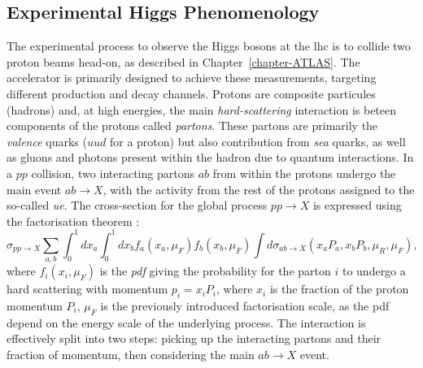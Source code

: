 \subsection{Experimental Higgs Phenomenology}
The experimental process to observe the Higgs bosons at the \gls{lhc} is to collide two proton beams head-on, as described in Chapter~\ref{chapter-ATLAS}. The accelerator is primarily designed to achieve these measurements, targeting different production and decay channels. Protons are composite particules (hadrons) and, at high energies, the main \textit{hard-scattering} interaction is beteen components of the protons called \textit{partons}. These partons are primarily the \textit{valence} quarks ($uud$ for a proton) but also contribution from \textit{sea} quarks, as well as gluons and photons present within the hadron due to quantum interactions. In a $pp$ collision, two interacting partons $ab$ from within the protons undergo the main event $ab \rightarrow X$, with the activity from the rest of the protons assigned to the so-called \textit{\gls{ue}}. The cross-section for the global process $pp \rightarrow X$ is expressed using the factorisation theorem \cite{collins2004factorization}: 
\begin{equation}
\sigma_{pp\rightarrow X} \sum_{a,b} \int_0^1 dx_a \int_0^1 dx_b f_a(x_a, \mu_F) f_b(x_b, \mu_F) \int d\sigma_{ab\rightarrow X}\left(x_aP_a, x_bP_b, \mu_R, \mu_F \right),
\end{equation}
where $f_i(x_i, \mu_F)$ is the \textit{\gls{pdf}} giving the probability for the parton $i$ to undergo a hard scattering with momentum $p_i = x_i P_i$, where $x_i$ is the fraction of the proton momentum $P_i$, $\mu_F$ is the previously introduced factorisation scale, as the \gls{pdf} depend on the energy scale of the underlying process. The interaction is effectively split into two steps: picking up the interacting partons and their fraction of momentum, then considering the main $ab \rightarrow X$ event.\\

